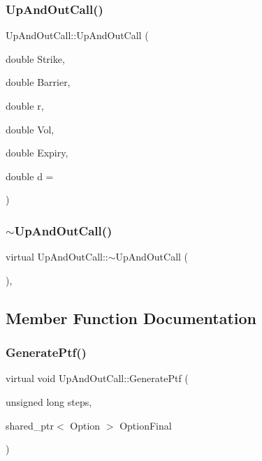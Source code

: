 \subsubsection{\texorpdfstring{Up\+And\+Out\+Call()}{UpAndOutCall()}}
{\footnotesize\ttfamily Up\+And\+Out\+Call\+::\+Up\+And\+Out\+Call (\begin{DoxyParamCaption}\item[{double}]{Strike,  }\item[{double}]{Barrier,  }\item[{double}]{r,  }\item[{double}]{Vol,  }\item[{double}]{Expiry,  }\item[{double}]{d = {} }\end{DoxyParamCaption})}

\hypertarget{classUpAndOutCall_a404ca86916e6ab0e614e58e72bd964b9}{}\label{classUpAndOutCall_a404ca86916e6ab0e614e58e72bd964b9} 
\subsubsection{\texorpdfstring{$\sim$\+Up\+And\+Out\+Call()}{~UpAndOutCall()}}
{\footnotesize\ttfamily virtual Up\+And\+Out\+Call\+::$\sim$\+Up\+And\+Out\+Call (\begin{DoxyParamCaption}{ }\end{DoxyParamCaption})\hspace{0.3cm}{\ttfamily [inline]}, {\ttfamily [virtual]}}



\subsection{Member Function Documentation}
\hypertarget{classUpAndOutCall_aed1268fa0b2bd83e9191385560bb7910}{}\label{classUpAndOutCall_aed1268fa0b2bd83e9191385560bb7910} 
\subsubsection{\texorpdfstring{Generate\+Ptf()}{GeneratePtf()}\hspace{0.1cm}{\footnotesize\ttfamily [1/2]}}
{\footnotesize\ttfamily virtual void Up\+And\+Out\+Call\+::\+Generate\+Ptf (\begin{DoxyParamCaption}\item[{unsigned long}]{steps,  }\item[{shared\+\_\+ptr$<$ Option $>$}]{Option\+Final }\end{DoxyParamCaption})\hspace{0.3cm}{\ttfamily [virtual]}}



